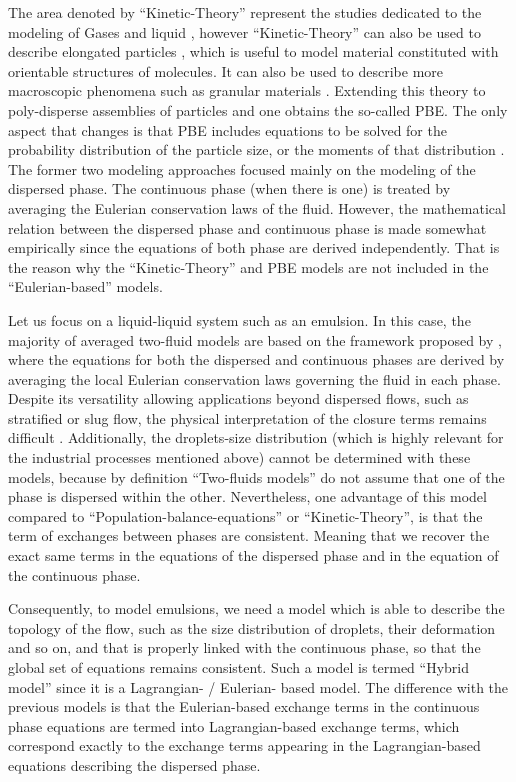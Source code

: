 The area denoted by ``Kinetic-Theory'' represent the studies dedicated to the modeling of Gases and liquid \citep{hansen2013theory,kardar2007statistical}, however  
``Kinetic-Theory'' can also be used to describe elongated particles \citet{curtiss1956kinetic}, which is useful to model material constituted with orientable structures of molecules.
It can also be used to describe more macroscopic phenomena such as granular materials \citet{rao2008introduction}.  
Extending this theory to poly-disperse assemblies of particles and one obtains the so-called PBE. 
The only aspect that changes is that PBE includes equations to be solved for the probability distribution of the particle size, or the moments of that distribution \citep{fox2023generalized,randolph2012theory}. 
The former two modeling approaches focused mainly on the modeling of the dispersed phase.
The continuous phase (when there is one) is treated by averaging the Eulerian conservation laws of the fluid. 
However, the mathematical relation between the dispersed phase and continuous phase is made somewhat empirically since the equations of both phase are derived independently. 
That is the reason why the ``Kinetic-Theory'' and PBE models are not included in the ``Eulerian-based'' models. 

Let us focus on a liquid-liquid system such as an emulsion. 
In this case, the majority of averaged two-fluid models are based on the framework proposed by \citet{drew1983mathematical}, where the equations for both the dispersed and continuous phases are derived by averaging the local Eulerian conservation laws governing the fluid in each phase.
Despite its versatility allowing applications beyond dispersed flows, such as stratified or slug flow, the physical interpretation of the closure terms remains difficult \citep{drew1983mathematical}.
Additionally, the droplets-size distribution (which is highly relevant for the industrial processes mentioned above) cannot be determined with these models, because by definition ``Two-fluids models'' do not assume that one of the phase is dispersed within the other.
Nevertheless, one advantage of this model compared to ``Population-balance-equations'' or ``Kinetic-Theory'', is that the term of exchanges between phases are consistent. 
Meaning that we recover the exact same terms in the equations of the dispersed phase and in the equation of the continuous phase. 

Consequently, to model emulsions, we need a model  which is able to describe the topology of the flow, such as the size distribution of droplets, their deformation and so on, and that is properly linked with the continuous phase, so that the global set of equations remains consistent. 
Such a model is termed ``Hybrid model'' since it is a Lagrangian- / Eulerian- based model.
The difference with the previous models is that the Eulerian-based exchange terms in the continuous phase equations are termed into Lagrangian-based exchange terms, which correspond exactly to the exchange terms appearing in the Lagrangian-based equations describing the dispersed phase. %

